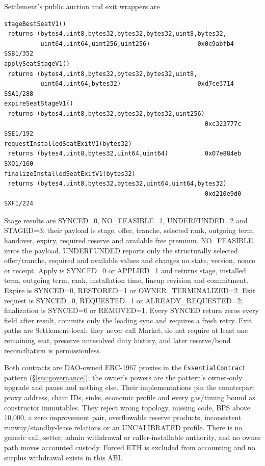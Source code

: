 \documentclass[a4paper,11pt]{article}
\newcommand{\code}[1]{\nolinkurl{#1}}
\begin{document}
Settlement's public auction and exit wrappers are
\begin{verbatim}
stageBestSeatV1()
 returns (bytes4,uint8,bytes32,bytes32,bytes32,uint8,bytes32,
          uint64,uint64,uint256,uint256)             0x0c9abfb4 SSB1/352
applySeatStageV1()
 returns (bytes4,uint8,bytes32,bytes32,bytes32,uint8,
          uint64,uint64,bytes32)                     0xd7ce3714 SSA1/288
expireSeatStageV1()
 returns (bytes4,uint8,bytes32,bytes32,bytes32,uint256)
                                                       0xc323777c SSE1/192
requestInstalledSeatExitV1(bytes32)
 returns (bytes4,uint8,bytes32,uint64,uint64)          0x07e884eb SXQ1/160
finalizeInstalledSeatExitV1(bytes32)
 returns (bytes4,uint8,bytes32,bytes32,uint64,uint64,bytes32)
                                                       0xd210e9d0 SXF1/224
\end{verbatim}
Stage results are SYNCED=0, NO\_FEASIBLE=1, UNDERFUNDED=2 and STAGED=3; their
payload is stage, offer, tranche, selected rank, outgoing term, handover,
expiry, required reserve and available free premium.  NO\_FEASIBLE zeros the
payload.  UNDERFUNDED reports only the structurally selected offer/tranche,
required and available values and changes no state, version, nonce or receipt.
Apply is SYNCED=0 or APPLIED=1 and returns stage, installed term, outgoing term,
rank, installation time, lineup revision and commitment.  Expire is SYNCED=0,
RESTORED=1 or OWNER\_TERMINALIZED=2.  Exit request is SYNCED=0, REQUESTED=1 or
ALREADY\_REQUESTED=2; finalization is SYNCED=0 or REMOVED=1.  Every SYNCED
return zeros every field after result, commits only the leading sync and
requires a fresh retry.  Exit paths are Settlement-local: they never call
Market, do not require at least one remaining seat, preserve unresolved duty
history, and later reserve/bond reconciliation is permissionless.

Both contracts are DAO-owned ERC-1967 proxies in the \code{EssentialContract}
pattern (\S\ref{sec:governance}); the owner's powers are the pattern's
owner-only upgrade and pause and nothing else.  Their implementations pin the
counterpart proxy address, chain IDs, sinks, economic profile and every
gas/timing bound as constructor immutables.  They reject wrong topology,
missing code, BPS above 10,000, a zero improvement pair, overflowable reserve
products, inconsistent runway/standby-lease relations or an UNCALIBRATED
profile.  There is no generic call, setter, admin withdrawal or
caller-installable authority, and no owner path moves accounted custody.
Forced ETH is excluded from accounting and no surplus withdrawal exists in
this ABI.
\end{document}
